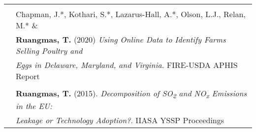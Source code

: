 \documentclass[letterpaper,11pt,oneside]{article}\usepackage[]{graphicx}\usepackage[]{xcolor}
\begin{document}
\begin{tabular}{p{1.2in} l}
                    & \\
                        & Chapman, J.*, Kothari, S.*, Lazarus-Hall, A.*, Olson, L.J., Relan, M.* \& \\
                        & \textbf{Ruangmas, T.} (2020) \textit{Using Online Data to Identify Farms Selling Poultry and} \\
                        & \textit{Eggs in Delaware, Maryland, and Virginia.} FIRE-USDA APHIS Report \href{https://drive.google.com/file/d/1tEazLXx8xA6s9KPVHxVDIlz273T3Oy9N/view?usp=drive_link}{\color{blue}{[LINK]}}\\
                        & \\
                        & \textbf{Ruangmas, T.} (2015). \textit{Decomposition of SO\textsubscript{2} and NO\textsubscript{x} Emissions in the EU:}  \\
                        &  \textit{Leakage or Technology Adoption?}. IIASA YSSP Proceedings \\
\end{tabular}
\end{document}
